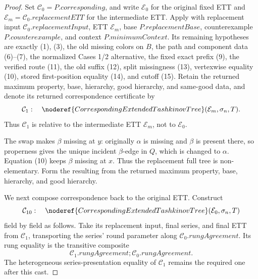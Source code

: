 \begin{proof}
Set \(\mathcal C_0=P.\mathit{corresponding}\), and write
\(\mathcal E_0\) for the original fixed ETT and
\(\mathcal E_m=\mathcal C_0.\mathit{replacementETT}\) for the
intermediate ETT.  Apply
 with replacement input
\(\mathcal C_0.\mathit{replacementInput}\), ETT \(\mathcal E_m\), base
\(P.\mathit{replacementBase}\), counterexample
\(P.\mathit{counterexample}\), and context
\(P.\mathit{minimumContext}\).  Its remaining hypotheses are exactly (1),
(3), the old missing colors on \(B\), the path and component data
(6)--(7), the normalized Cases 1/2 alternative, the fixed exact prefix
(9), the verified route (11), the old suffix (12), split missingness (13),
vertexwise equality (10), stored first-position equality (14), and cutoff
(15).  Retain the returned maximum property, base, hierarchy, good
hierarchy, and same-good data, and denote its returned correspondence
certificate by
\[
 \mathcal C_1:\quad
 \noderef{CorrespondingExtendedTashkinovTree}
   (\mathcal E_m,\sigma_n,T).
\]
Thus \(\mathcal C_1\) is relative to the intermediate ETT
\(\mathcal E_m\), not to \(\mathcal E_0\).

The swap makes \(\beta\) missing at \(y\): originally \(\alpha\) is
missing and \(\beta\) is present there, so properness gives the unique
incident \(\beta\)-edge in \(Q\), which is changed to \(\alpha\).
Equation (10) keeps \(\beta\) missing at \(x\).  Thus the replacement full
tree is non-elementary.  Form the resulting
 from the returned maximum property,
base, hierarchy, and good hierarchy.

We next compose correspondence back to the original ETT.  Construct
\[
 \mathcal C_{10}:\quad
 \noderef{CorrespondingExtendedTashkinovTree}
   (\mathcal E_0,\sigma_n,T)
\]
field by field as follows.  Take its replacement input, final series, and
final ETT from \(\mathcal C_1\), transporting the series' round parameter
along \(\mathcal C_0.\mathit{rungAgreement}\).  Its rung equality is the
transitive composite
\[
 \mathcal C_1.\mathit{rungAgreement}\mathbin{;}
 \mathcal C_0.\mathit{rungAgreement}.
\]
The heterogeneous series-presentation equality of \(\mathcal C_1\)
remains the required one after this cast.


\end{proof}
